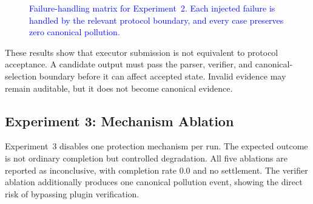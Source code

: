 \documentclass{article}
\theoremstyle{plain}
\begin{document}
\begin{figure}[!htbp]
{{
}
}
\caption{\textcolor{blue}{Failure-handling matrix for Experiment~2. Each injected failure is handled by the relevant protocol boundary, and every case preserves zero canonical pollution.}}
\label{fig:failure-handling-matrix}
\end{figure}

These results show that executor submission is not equivalent to protocol
acceptance. A candidate output must pass the parser, verifier, and
canonical-selection boundary before it can affect accepted state. Invalid
evidence may remain auditable, but it does not become canonical evidence.

\FloatBarrier

\subsection{Experiment 3: Mechanism Ablation}
\label{subsec:exp3-ablation}

Experiment~3 disables one protection mechanism per run. The expected outcome is
not ordinary completion but controlled degradation. All five ablations are
reported as inconclusive, with completion rate 0.0 and no settlement. The
verifier ablation additionally produces one canonical pollution event, showing
the direct risk of bypassing plugin verification.
\end{document}
